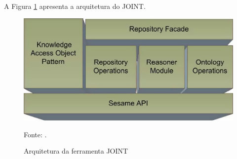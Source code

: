 A Figura \ref{fig:joint} apresenta a arquitetura do JOINT.

\begin{figure}[!ht]
	\centering
	\includegraphics[width=1\textwidth]{./imagens/joint.png}
	\caption{Arquitetura da ferramenta JOINT}
	\footnotesize{Fonte: \cite{holanda2013joint}.}
	\label{fig:joint}
\end{figure}